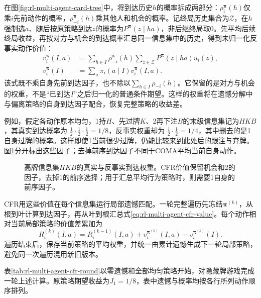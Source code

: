 在图\ref{fig:rl-multi-agent-card-tree}中，将到达历史$h$的概率拆成两部分：$\rho_i^{\bm\pi}(h)$仅乘$i$先前动作的概率，$\rho_{-i}^{\bm\pi}(h)$乘其他人和机会的概率。记终局历史集合为$\mathcal Z$，在$h$强制选$a$、随后按原策略到达$z$的概率为$P^{\bm\pi}(z\mid ha)$，非后继终局取0。先平均后续终局收益，再按对方与机会的到达概率汇总同一信息集中的历史，得到未归一化反事实动作价值：
\begin{align}
 v_i^{\bm\pi}(I,a)
 &=\sum_{h\in I}\rho_{-i}^{\bm\pi}(h)
         \sum_{z\in\mathcal Z}P^{\bm\pi}(z\mid ha)u_i(z),\\
 v_i^{\bm\pi}(I)&=\sum_a\pi_i(a\mid I)v_i^{\bm\pi}(I,a).
 \label{eq:rl-multi-agent-cfr-value}
\end{align}
该式既不乘自身先前到达因子，也不除以$\sum_{h\in I}\rho_{-i}(h)$。它保留的是对方与机会的权重，不是“已到达$I$”之后归一化的普通条件期望。这样的权重将在遗憾分解中与偏离策略的自身到达因子配合，恢复完整策略的收益差。

例如，假定各动作原本均匀，1持$H$、先过牌$K$、2再下注$B$的末级信息集记为$HKB$，其真实到达概率为
$\tfrac12\cdot\tfrac12\cdot\tfrac12=1/8$，反事实权重却为
$\tfrac12\cdot\tfrac12=1/4$，其中删去的是1自身过牌的概率。这样即使1当前很少过牌，仍能比较来到此处后的跟注与弃牌。图\ref{fig:rl-multi-agent-cfr-reach}分开标出这些因子；去掉前序到达因子不同于COMA平均当前自身动作。

\begin{figure}[htbp]
 \centering
 
 \caption{高牌信息集$HKB$的真实与反事实到达权重。CFR价值保留机会和2的因子，去掉1的前序选择；用于汇总平均行为策略时，则需要1自身的前序因子。}
 \label{fig:rl-multi-agent-cfr-reach}
\end{figure}

CFR用这些价值在每个信息集运行局部遗憾匹配。一轮完整遍历先冻结$\bm\pi^{(k)}$，从根到叶计算到达因子，再从叶到根汇总式\eqref{eq:rl-multi-agent-cfr-value}。每个动作相对当前局部策略的价值差累加为
\[
 R_i^{(k)}(I,a)=R_i^{(k-1)}(I,a)+
        v_i^{\bm\pi^{(k)}}(I,a)-v_i^{\bm\pi^{(k)}}(I).
\]
遍历结束后，保存当前策略的平均权重，并统一由累计遗憾生成下一轮局部策略，避免同一次遍历混用新旧版本。

表\ref{tab:rl-multi-agent-cfr-round}以零遗憾和全部均匀策略开始，对隐藏牌游戏完成一轮上述计算。原策略期望收益为$J_1=1/8$，表中遗憾与概率均按各行所列动作顺序排列。

